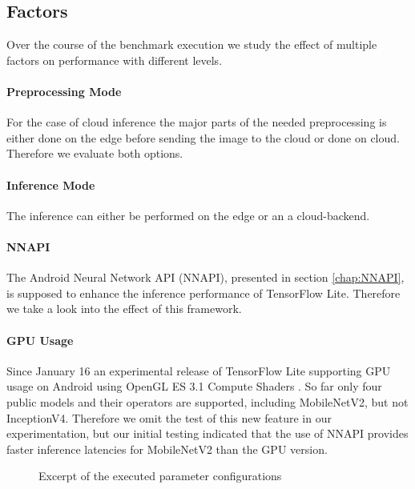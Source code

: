 \subsection{Factors}
Over the course of the benchmark execution we study the effect of multiple factors on performance with different levels.

\paragraph{Preprocessing Mode}
For the case of cloud inference the major parts of the needed preprocessing is either done on the edge before sending the image to the cloud or done on cloud. Therefore we evaluate both options.
\paragraph{Inference Mode}
The inference can either be performed on the edge or an a cloud-backend.


\paragraph{NNAPI}
The Android Neural Network API (NNAPI), presented in section \ref{chap:NNAPI}, is supposed to enhance the inference performance of TensorFlow Lite. Therefore we take a look into the effect of this framework.
\paragraph{GPU Usage}
Since January 16 an experimental release of TensorFlow Lite supporting GPU usage on Android using OpenGL ES 3.1 Compute Shaders \cite{tfLiteGPU}.
So far only four public models and their operators are supported, including MobileNetV2, but not InceptionV4. 
Therefore we omit the test of this new feature in our experimentation, but our initial testing indicated that the use of NNAPI provides faster inference latencies for MobileNetV2 than the GPU version.


\begin{figure}[!htb]
\centering
 \scalebox{.7}{}

\caption{Excerpt of the executed parameter configurations}
\label{fig:tree}
\end{figure}


